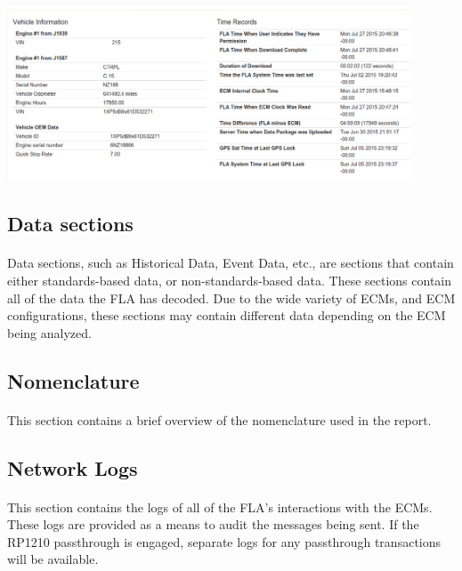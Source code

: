 \documentclass[11pt, oneside]{book}
\begin{document}
\begin{center}
\includegraphics[width=0.9\textwidth]{../media/fla_portal_screenshots/full_report/vehicle_info}
\end{center}


\subsection{Data sections}
\paragraph{  }
Data sections, such as Historical Data, Event Data, etc., are sections that contain either standards-based data, or non-standards-based data. These sections contain all of the data the FLA has decoded. Due to the wide variety of ECMs, and ECM configurations, these sections may contain different data depending on the ECM being analyzed.


\subsection{Nomenclature}
\paragraph{  }
This section contains a brief overview of the nomenclature used in
the report.


\subsection{Network Logs}
\paragraph{  }
This section contains the logs of all of the FLA's interactions with
the ECMs. These logs are provided as a means to audit the messages
being sent. If the RP1210 passthrough is engaged, separate logs for
any passthrough transactions will be available.
\end{document}
